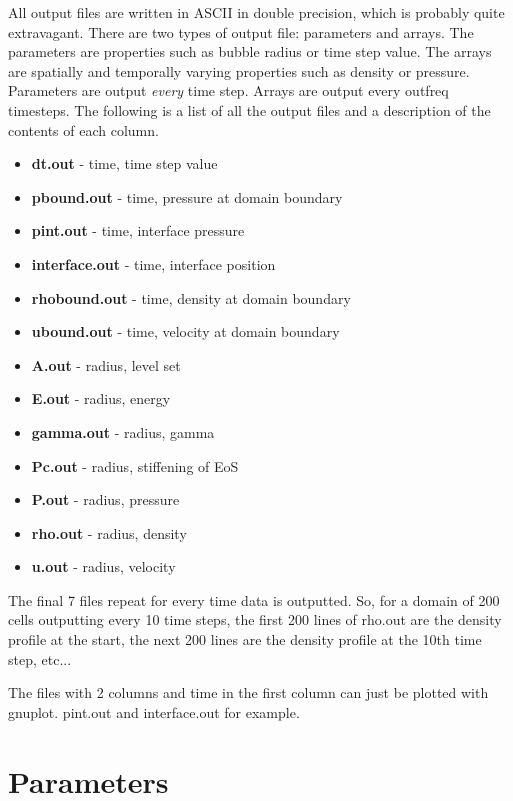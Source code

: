 \documentclass{article}
\begin{document}
All output files are written in ASCII in double precision, which is probably quite extravagant. There are two types of output file: parameters and arrays. The parameters are properties such as bubble radius or time step value. The arrays are spatially and temporally varying properties such as density or pressure. Parameters are output \textit{every} time step. Arrays are output every outfreq timesteps. The following is a list of all the output files and a description of the contents of each column.
\begin{itemize}
\item \textbf{dt.out} - time, time step value
\item \textbf{pbound.out} - time, pressure at domain boundary
\item \textbf{pint.out} - time, interface pressure
\item \textbf{interface.out} - time, interface position
\item \textbf{rhobound.out} - time, density at domain boundary
\item \textbf{ubound.out} - time, velocity at domain boundary
\item \textbf{A.out} - radius, level set
\item \textbf{E.out} - radius, energy
\item \textbf{gamma.out} - radius, gamma
\item \textbf{Pc.out} - radius, stiffening of EoS
\item \textbf{P.out} - radius, pressure
\item \textbf{rho.out} - radius, density
\item \textbf{u.out} - radius, velocity
\end{itemize}
		
The final 7 files repeat for every time data is outputted. So, for a domain of 200 cells outputting every 10 time steps, the first 200 lines of rho.out are
the density profile at the start, the next 200 lines are the density profile at the 10th time step, etc...

The files with 2 columns and time in the first column can just be plotted with gnuplot. pint.out and interface.out for example.

\section{Parameters}
\end{document}
